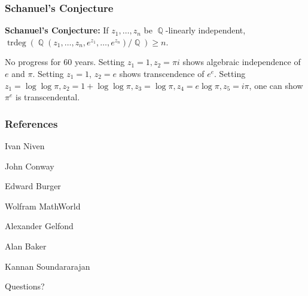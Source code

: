 \documentclass{beamer}
\DeclareMathOperator{\Q}{\mathbb{Q}}
\DeclareMathOperator{\trdeg}{trdeg}
\begin{document}
    \begin{frame}
        \frametitle{Schanuel's Conjecture}
        \begin{center}
        \begin{mybox}
            \textbf{Schanuel's Conjecture:} If $z_1, \ldots, z_n$ be $\Q$-linearly independent, $\trdeg(\Q(z_1, \ldots, z_n, e^{z_1}, \ldots, e^{z_n})/\Q) \geq n$. 
        \end{mybox}
        No progress for 60 years. Setting $z_1 = 1, z_2 = \pi i$ shows algebraic independence of $e$ and $\pi$. Setting $z_1 = 1$, $z_2 = e$ shows transcendence of $e^{e}$.
        Setting $z_1 = \log \log \pi, z_2 = 1 + \log \log \pi, z_3 = \log \pi, z_4 = e \log \pi, z_5 = i \pi$, one can show $\pi^{e}$ is transcendental. 
        \end{center}
    \end{frame}
    \begin{frame}
        \frametitle{References}
        \begin{thebibliography}{99} %
		\footnotesize %
	
			 Ivan Niven

            John Conway

            Edward Burger 

            Wolfram MathWorld
        
            Alexander Gelfond

            Alan Baker 

            Kannan Soundararajan

	\end{thebibliography} 
    \end{frame}

    \begin{frame}
        \begin{center}
            {\bfseries\huge{}} \par
            Questions?
        \end{center}
    \end{frame}
\end{document}
